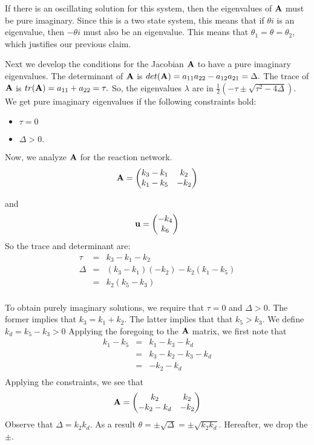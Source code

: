 \documentclass[11pt]{article}
\begin{document}
If there is an oscillating solution for this system, then the
eigenvalues of ${\bf A}$ must be pure imaginary. Since this is a two
state system, this means that if $\theta i$ is an eigenvalue, then
$-\theta i$ must also be an eigenvalue. This means that
$\theta_1 = \theta = \theta_2$, which justifies our previous claim.

Next we develop the conditions for the Jacobian
${\bf A}$ to have a pure imaginary
eigenvalues. The determinant of ${\bf A}$ is
$det({\bf A}) = a_{11} a_{22} - a_{12} a_{21} = \Delta.$
The trace of
${\bf A}$ is $tr({\bf A}) = a_{11} + a_{22} = \tau.$
So, the eigenvalues $\lambda$ are in
$\frac{1}{2} \left( - \tau \pm \sqrt{\tau^2 - 4 \Delta} \right). $
We get pure imaginary eigenvalues 
if the following constraints hold:
\begin{itemize}
\item $\tau = 0$ 
\item $\Delta > 0.$
\end{itemize}

Now, we analyze ${\bf A}$ for the reaction network.
\begin{equation*}
{\bf A} =
\begin{pmatrix}
k_3 - k_1 & k_2 \\
k_1 - k_5 & -k_2 \\
\end{pmatrix}
\end{equation*}

and 
\begin{equation*}
{\bf u} = 
\begin{pmatrix} - k_4 \\ k_6 \\ \end{pmatrix}
\end{equation*}
So the trace and determinant are:
\begin{eqnarray*}
\tau & = & k_3 -k_1 - k_2 \\
\Delta & = & (k_3 - k_1)(-k_2) - k_2 (k_1 - k_5) \\
& = & k_2 (k_5 - k_3) \\
\end{eqnarray*}

To obtain purely imaginary solutions, we require that $\tau =0$ and
$\Delta > 0$. The former implies that $k_3 = k_1 + k_2$. The latter
implies that that $k_5 > k_3$. We define $k_d = k_5 - k_3 > 0$
Applying the foregoing to the ${\bf A}$ matrix, we first note that
\begin{align*}
k_1 - k_5 & = & k_1 - k_3 -k_d \\
& = & k_3 - k_2 - k_3 - k_d \\
& = & -k_2 - k_d \\
\end{align*}
Applying the constraints,
we see that
\begin{equation*}
{\bf A} = 
\begin{pmatrix}
k_2 & k_2 \\
-k_2 - k_d & -k_2 \\
\end{pmatrix}
\end{equation*}
Observe that $\Delta = k_2 k_d$.
As a result
$\theta = \pm \sqrt{\Delta} = \pm \sqrt{k_2 k_d}$. Hereafter, we drop
the $\pm$.
\end{document}
